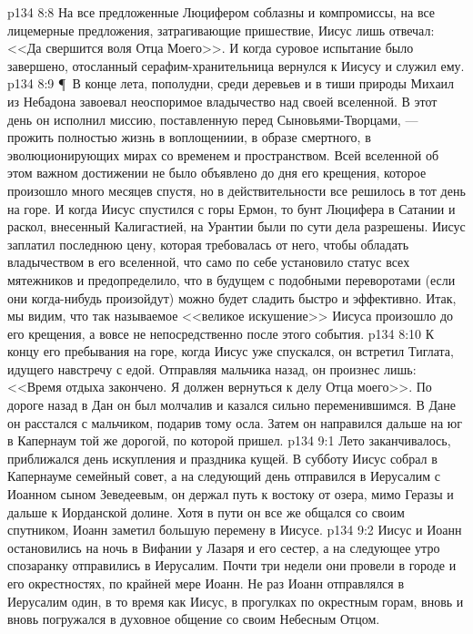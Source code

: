 \vs p134 8:8 На все предложенные Люцифером соблазны и компромиссы, на все лицемерные предложения, затрагивающие пришествие, Иисус лишь отвечал: <<Да свершится воля Отца Моего>>. И когда суровое испытание было завершено, отосланный серафим\hyp{}хранительница вернулся к Иисусу и служил ему.
\vs p134 8:9 \P\ В конце лета, пополудни, среди деревьев и в тиши природы Михаил из Небадона завоевал неоспоримое владычество над своей вселенной. В этот день он исполнил миссию, поставленную перед Сыновьями\hyp{}Творцами, --- прожить полностью жизнь в воплощениии, в образе смертного, в эволюционирующих мирах со временем и пространством. Всей вселенной об этом важном достижении не было объявлено до дня его крещения, которое произошло много месяцев спустя, но в действительности все решилось в тот день на горе. И когда Иисус спустился с горы Ермон, то бунт Люцифера в Сатании и раскол, внесенный Калигастией, на Урантии были по сути дела разрешены. Иисус заплатил последнюю цену, которая требовалась от него, чтобы обладать владычеством в его вселенной, что само по себе установило статус всех мятежников и предопределило, что в будущем с подобными переворотами (если они когда\hyp{}нибудь произойдут) можно будет сладить быстро и эффективно. Итак, мы видим, что так называемое <<великое искушение>> Иисуса произошло до его крещения, а вовсе не непосредственно после этого события.
\vs p134 8:10 К концу его пребывания на горе, когда Иисус уже спускался, он встретил Тиглата, идущего навстречу с едой. Отправляя мальчика назад, он произнес лишь: <<Время отдыха закончено. Я должен вернуться к делу Отца моего>>. По дороге назад в Дан он был молчалив и казался сильно переменившимся. В Дане он расстался с мальчиком, подарив тому осла. Затем он направился дальше на юг в Капернаум той же дорогой, по которой пришел.
\vs p134 9:1 Лето заканчивалось, приближался день искупления и праздника кущей. В субботу Иисус собрал в Капернауме семейный совет, а на следующий день отправился в Иерусалим с Иоанном сыном Зеведеевым, он держал путь к востоку от озера, мимо Геразы и дальше к Иорданской долине. Хотя в пути он все же общался со своим спутником, Иоанн заметил большую перемену в Иисусе.
\vs p134 9:2 Иисус и Иоанн остановились на ночь в Вифании у Лазаря и его сестер, а на следующее утро спозаранку отправились в Иерусалим. Почти три недели они провели в городе и его окрестностях, по крайней мере Иоанн. Не раз Иоанн отправлялся в Иерусалим один, в то время как Иисус, в прогулках по окрестным горам, вновь и вновь погружался в духовное общение со своим Небесным Отцом.
